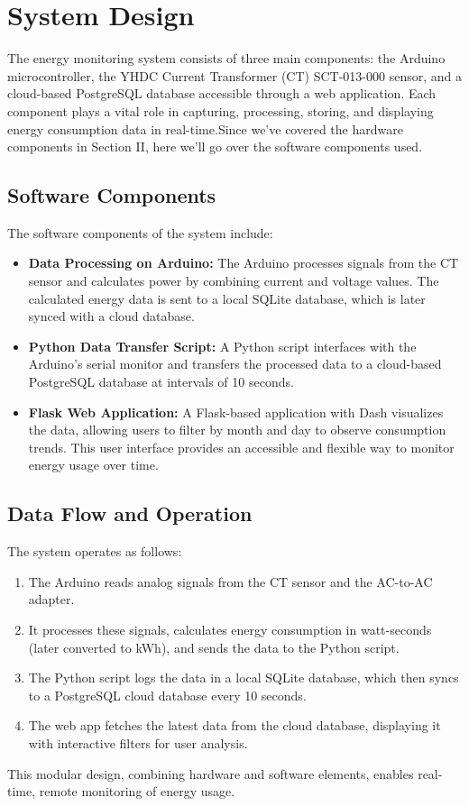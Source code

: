 \section{System Design}
\noindent The energy monitoring system consists of three main components:
the Arduino microcontroller, the YHDC Current Transformer (CT) SCT-013-000 sensor, and a cloud-based PostgreSQL database accessible through a web application. Each component plays a vital role in capturing, processing, storing, and displaying energy consumption data in real-time.Since we've covered the hardware components in Section II, here we'll go over the software components used.

\subsection{Software Components}
\noindent The software components of the system include:
\begin{itemize}
    \item \textbf{Data Processing on Arduino:} The Arduino processes signals from the CT sensor and calculates power by combining current and voltage values. The calculated energy data is sent to a local SQLite database, which is later synced with a cloud database.
    \item \textbf{Python Data Transfer Script:} A Python script interfaces with the Arduino's serial monitor and transfers the processed data to a cloud-based PostgreSQL database at intervals of 10 seconds.
    \item \textbf{Flask Web Application:} A Flask-based application with Dash visualizes the data, allowing users to filter by month and day to observe consumption trends. This user interface provides an accessible and flexible way to monitor energy usage over time.
\end{itemize}

\subsection{Data Flow and Operation}



\noindent The system operates as follows:
\begin{enumerate}
    \item The Arduino reads analog signals from the CT sensor and the AC-to-AC adapter.
    \item It processes these signals, calculates energy consumption in watt-seconds (later converted to kWh), and sends the data to the Python script.
    \item The Python script logs the data in a local SQLite database, which then syncs to a PostgreSQL cloud database every 10 seconds.
    \item The web app fetches the latest data from the cloud database, displaying it with interactive filters for user analysis.
\end{enumerate}

\noindent This modular design, combining hardware and software elements, enables real-time, remote monitoring of energy usage.
